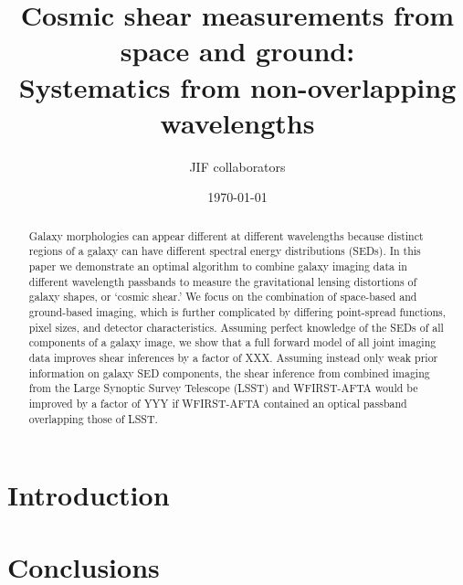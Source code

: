 \documentclass[11pt, letterpaper]{article}
\begin{document}
  
\title{Cosmic shear measurements from space and ground: \\Systematics from non-overlapping wavelengths}

\author{JIF collaborators}

\date{\today}

\maketitle

\begin{abstract}
	Galaxy morphologies can appear different at different wavelengths because distinct regions of 
	a galaxy can have different spectral energy distributions (SEDs). In this paper we demonstrate an 
	optimal algorithm to combine galaxy imaging data in different wavelength passbands to measure 
	the gravitational lensing distortions of galaxy shapes, or `cosmic shear.'
	We focus on the combination of space-based and ground-based imaging, which is
	further complicated by differing point-spread functions, pixel sizes, and detector characteristics.
	Assuming perfect knowledge of the SEDs of all components of a galaxy image, we show that a 
	full forward model of all joint imaging data improves shear inferences by a factor of XXX. 
	Assuming instead only weak prior information on galaxy SED components, the shear inference from 
	combined imaging from the Large Synoptic Survey Telescope (LSST) and WFIRST-AFTA would be improved 
	by a factor of YYY if WFIRST-AFTA contained an optical passband overlapping those of LSST.
\end{abstract}

\section{Introduction} %
\label{sec:introduction}



\section{Conclusions} %
\label{sec:conclusions}

\end{document}

